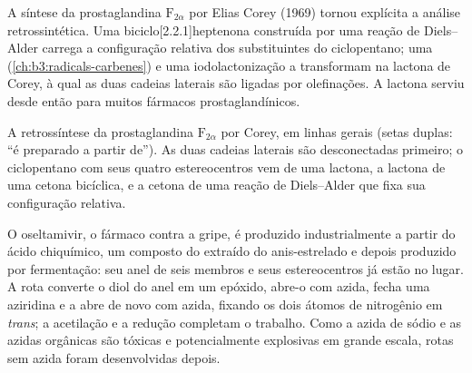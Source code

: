 A síntese da prostaglandina $\mathrm F_{2\alpha}$ por Elias Corey (1969) tornou explícita a análise
retrossintética. Uma biciclo[2.2.1]heptenona construída por uma reação de Diels--Alder carrega
a configuração relativa dos substituintes do ciclopentano; uma
 (\cref{ch:b3:radicals-carbenes}) e uma
iodolactonização a transformam na lactona de Corey, à qual as duas cadeias laterais
são ligadas por olefinações. A lactona serviu desde então para muitos fármacos
prostaglandínicos.

\begin{omfigure}

{\small A retrossíntese da prostaglandina $\mathrm F_{2\alpha}$ por Corey, em linhas gerais (setas duplas: ``é
preparado a partir de''). As duas cadeias laterais são desconectadas primeiro; o ciclopentano com
seus quatro estereocentros vem de uma lactona, a lactona de uma cetona bicíclica,
e a cetona de uma reação de Diels--Alder que fixa sua configuração
relativa.}
\end{omfigure}

O oseltamivir, o fármaco contra a gripe, é produzido industrialmente a partir do ácido chiquímico, um
composto do  extraído do anis-estrelado e depois produzido por
fermentação: seu anel de seis membros e seus estereocentros já estão no lugar.
A rota converte o diol do anel em um epóxido, abre-o com azida, fecha uma
aziridina e a abre de novo com azida, fixando os dois átomos de nitrogênio
em \textit{trans}; a acetilação e a redução completam o trabalho. Como a azida de sódio e
as azidas orgânicas são tóxicas e potencialmente explosivas em grande escala, rotas
sem azida foram desenvolvidas depois.

